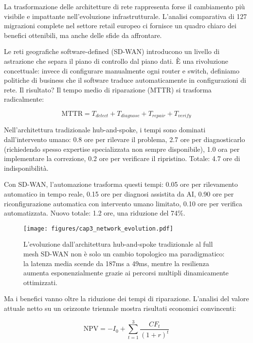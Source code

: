 \documentclass[12pt,a4paper,twoside]{book}
\begin{document}
La trasformazione delle architetture di rete rappresenta forse il cambiamento più visibile e impattante nell'evoluzione infrastrutturale. L'analisi comparativa di 127 migrazioni complete nel settore retail europeo\autocite{gartner2024sdwan} ci fornisce un quadro chiaro dei benefici ottenibili, ma anche delle sfide da affrontare.

Le reti geografiche software-defined (SD-WAN) introducono un livello di astrazione che separa il piano di controllo dal piano dati. È una rivoluzione concettuale: invece di configurare manualmente ogni router e switch, definiamo politiche di business che il software traduce automaticamente in configurazioni di rete. Il risultato? Il tempo medio di riparazione (MTTR) si trasforma radicalmente:

\begin{equation}
\text{MTTR} = T_{detect} + T_{diagnose} + T_{repair} + T_{verify}
\label{eq:mttr}
\end{equation}

Nell'architettura tradizionale hub-and-spoke, i tempi sono dominati dall'intervento umano: 0.8 ore per rilevare il problema, 2.7 ore per diagnosticarlo (richiedendo spesso expertise specializzata non sempre disponibile), 1.0 ora per implementare la correzione, 0.2 ore per verificare il ripristino. Totale: 4.7 ore di indisponibilità.

Con SD-WAN, l'automazione trasforma questi tempi: 0.05 ore per rilevamento automatico in tempo reale, 0.15 ore per diagnosi assistita da AI, 0.90 ore per riconfigurazione automatica con intervento umano limitato, 0.10 ore per verifica automatizzata. Nuovo totale: 1.2 ore, una riduzione del 74\%.

\begin{figure}[htbp]
\centering
\texttt{[image: figures/cap3\_network\_evolution.pdf]}
\caption{L'evoluzione dall'architettura hub-and-spoke tradizionale al full mesh SD-WAN non è solo un cambio topologico ma paradigmatico: la latenza media scende da 187ms a 49ms, mentre la resilienza aumenta esponenzialmente grazie ai percorsi multipli dinamicamente ottimizzati.}
\label{fig:network_evolution}
\end{figure}

Ma i benefici vanno oltre la riduzione dei tempi di riparazione. L'analisi del valore attuale netto su un orizzonte triennale mostra risultati economici convincenti:

\begin{equation}
\text{NPV} = -I_0 + \sum_{t=1}^{3} \frac{CF_t}{(1+r)^t}
\label{eq:npv}
\end{equation}
\end{document}
